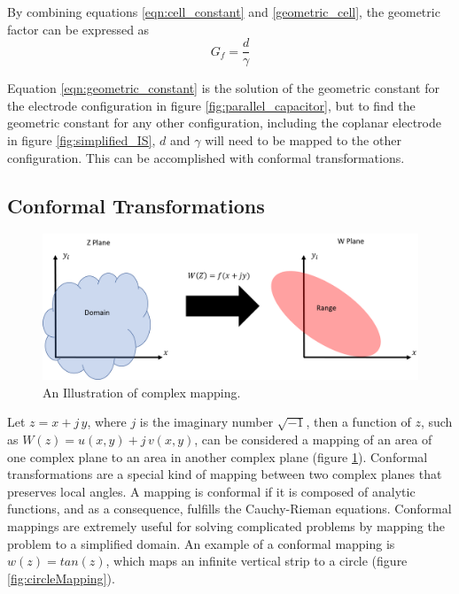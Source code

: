   \noindent By combining equations \ref{eqn:cell_constant} and \ref{geometric_cell}, the geometric factor can be expressed as
  \begin{equation}
      G_f = \frac{d}{\gamma}
      \label{eqn:geometric_constant}
  \end{equation}
  
  \par Equation \ref{eqn:geometric_constant} is the solution of the geometric constant for the electrode configuration in figure \ref{fig:parallel_capacitor}, but to find the geometric constant for any other configuration, including the coplanar electrode in figure \ref{fig:simplified_IS}, $d$ and $\gamma$ will need to be mapped to the other configuration. This can be accomplished with conformal transformations.
  
  
  \subsection{Conformal Transformations}
  
  \begin{figure}[h]
  \centering
  \includegraphics[width=\textwidth]{images/mapping.png}
  \caption[Illustration of complex mapping.]{An Illustration of complex mapping.}
  \label{fig:mapping}
  \end{figure}
  
  \par Let $z = x + j\,y$, where $j$ is the imaginary number $\sqrt{-1}$, then a function of $z$, such as $W(z) = u(x,y) + j\,v(x,y)$, can be considered a mapping of an area of one complex plane to an area in another complex plane (figure \ref{fig:mapping}). Conformal transformations are a special kind of mapping between two complex planes that preserves local angles. A mapping is conformal if it is composed of analytic functions, and as a consequence, fulfills the Cauchy-Rieman equations. Conformal mappings are extremely useful for solving complicated problems by mapping the problem to a simplified domain. An example of a conformal mapping is $w(z) = tan(z)$, which maps an infinite vertical strip to a circle (figure \ref{fig:circleMapping}). 

